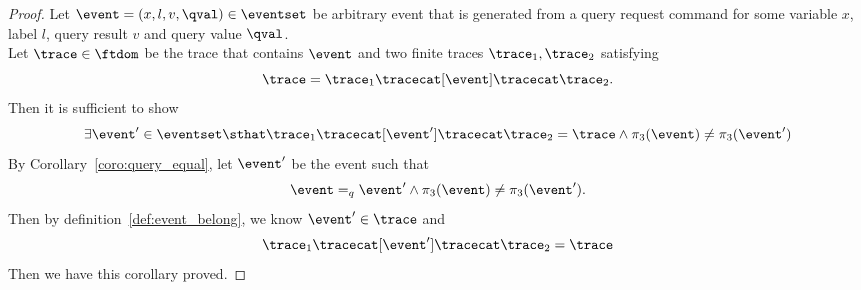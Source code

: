 \begin{proof}
    Let $\event = (x, l, v, \qval) \in \eventset$ be arbitrary event that  is generated from a query request command for some variable $x$, label $l$, query result $v$ and query value $\qval$.
    \\
    Let $ \trace \in \ftdom$ be the trace that contains $\event$ and two finite traces $\trace_1, \trace_2$ satisfying
    \[
      \trace = \trace_1 \tracecat [\event] \tracecat \trace_2.
      \]
    Then it is sufficient to show
    \[
      \exists \event' \in \eventset \sthat 
      \trace_1 \tracecat [\event'] \tracecat \trace_2 = \trace  \land \pi_3(\event) \neq \pi_3(\event') 
    \]
    By Corollary~\ref{coro:query_equal}, let $\event'$ be the event such that 
    \[
      \event =_{q}\event' \land  \pi_3(\event) \neq \pi_3(\event').
    \]
    Then by definition~\ref{def:event_belong}, we know 
    $\event' \in \trace$ and 
    \[
      \trace_1 \tracecat [\event'] \tracecat \trace_2 = \trace
    \]
    Then we have this corollary proved.
\end{proof}